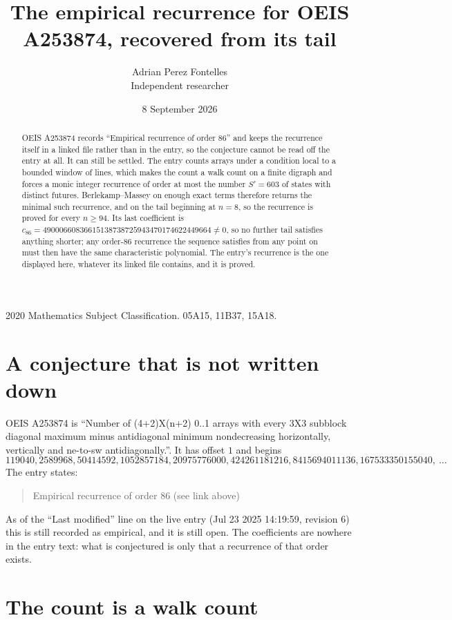 \documentclass[11pt,a4paper]{article}
\title{The empirical recurrence for OEIS A253874, recovered from its tail}
\author{Adrian Perez Fontelles\\ \small Independent researcher}
\date{8 September 2026}
\theoremstyle{plain}
\theoremstyle{definition}
\begin{document}
\maketitle

\begin{abstract}
OEIS A253874 records ``Empirical recurrence of order $86$'' and keeps the recurrence itself in
a linked file rather than in the entry, so the conjecture cannot be read off the entry at all.
It can still be settled. The entry counts arrays under a condition local to a bounded window of
lines, which makes the count a walk count on a finite digraph and forces a monic integer
recurrence of order at most the number $S'=603$ of states with distinct futures. Berlekamp--Massey on
enough exact terms therefore returns the minimal such recurrence, and on the tail beginning at $n=8$, so the recurrence is proved for every $n\ge94$.
Its last coefficient is $c_{86}=49000660836615138738725943470174622449664\neq0$, so no further tail satisfies anything
shorter; any order-$86$ recurrence the sequence satisfies from any point on must then have
the same characteristic polynomial. The entry's recurrence is the one displayed here, whatever
its linked file contains, and it is proved.
\end{abstract}

\noindent\small 2020 Mathematics Subject Classification. 05A15, 11B37, 15A18.\normalsize

\section{A conjecture that is not written down}

OEIS A253874 is ``Number of (4+2)X(n+2) 0..1 arrays with every 3X3 subblock diagonal maximum minus antidiagonal minimum nondecreasing horizontally, vertically and ne-to-sw antidiagonally.''. It has offset $1$ and begins
\[
119040, 2589968, 50414592, 1052857184, 20975776000, 424261181216, 8415694011136, 167533350155040,\ \dots
\]
The entry states:
\begin{quote}
Empirical recurrence of order 86 (see link above)
\end{quote}
As of the ``Last modified'' line on the live entry (Jul 23 2025 14:19:59, revision 6)
this is still recorded as empirical, and it is still open. The coefficients are nowhere in the
entry text: what is conjectured is only that a recurrence of that order exists.

\section{The count is a walk count}
\end{document}
